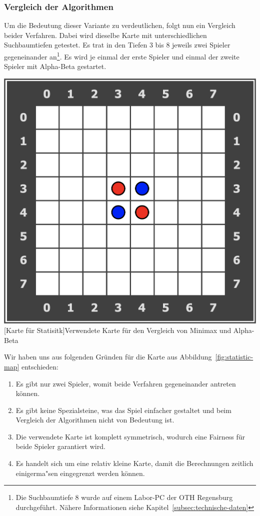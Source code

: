 \subsubsection{Vergleich der Algorithmen}\label{subsubsec:vergleich-der-algorithmen}
Um die Bedeutung dieser Variante zu verdeutlichen, folgt nun ein Vergleich beider Verfahren.
Dabei wird dieselbe Karte mit unterschiedlichen Suchbaumtiefen getestet.
Es trat in den Tiefen 3 bis 8 jeweils zwei Spieler gegeneinander an\footnote{Die Suchbaumtiefe 8 wurde auf einem Labor-PC der OTH Regensburg durchgef\"uhrt. N\"ahere Informationen siehe Kapitel~\ref{subsec:technische-daten}}.
Es wird je einmal der erste Spieler und einmal der zweite Spieler mit Alpha-Beta gestartet.

\vspace{1em}
\begin{minipage}{\linewidth}
    \centering
    \includegraphics[width=0.3\linewidth]{pics/statistic-map}
    [Karte für Statisitk]{Verwendete Karte für den Vergleich von Minimax und Alpha-Beta}
    \label{fig:statistic-map}
\end{minipage}

Wir haben uns aus folgenden Gr\"unden f\"ur die Karte aus Abbildung~\ref{fig:statistic-map} entschieden:
\begin{enumerate}
    \item Es gibt nur zwei Spieler, womit beide Verfahren gegeneinander antreten k\"onnen.
    \item Es gibt keine Spezialsteine, was das Spiel einfacher gestaltet und beim Vergleich der Algorithmen nicht von Bedeutung ist.
    \item Die verwendete Karte ist komplett symmetrisch, wodurch eine Fairness f\"ur beide Spieler garantiert wird.
    \item Es handelt sich um eine relativ kleine Karte, damit die Berechnungen zeitlich einigerma"sen eingegrenzt werden k\"onnen.
\end{enumerate}

